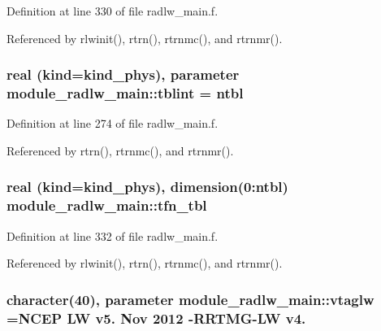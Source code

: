 Definition at line 330 of file radlw\+\_\+main.\+f.



Referenced by rlwinit(), rtrn(), rtrnmc(), and rtrnmr().

\subsubsection[{\texorpdfstring{tblint}{tblint}}]{\setlength{\rightskip}{0pt plus 5cm}real (kind=kind\+\_\+phys), parameter module\+\_\+radlw\+\_\+main\+::tblint = ntbl\hspace{0.3cm}{\ttfamily [private]}}\hypertarget{namespacemodule__radlw__main_af6b84954042db7b1e2a6abdb4d401ccf}{}\label{namespacemodule__radlw__main_af6b84954042db7b1e2a6abdb4d401ccf}


Definition at line 274 of file radlw\+\_\+main.\+f.



Referenced by rtrn(), rtrnmc(), and rtrnmr().

\subsubsection[{\texorpdfstring{tfn\+\_\+tbl}{tfn_tbl}}]{\setlength{\rightskip}{0pt plus 5cm}real (kind=kind\+\_\+phys), dimension(0\+:ntbl) module\+\_\+radlw\+\_\+main\+::tfn\+\_\+tbl\hspace{0.3cm}{\ttfamily [private]}}\hypertarget{namespacemodule__radlw__main_a71dcfb3c365280e100e180fd1ce939ad}{}\label{namespacemodule__radlw__main_a71dcfb3c365280e100e180fd1ce939ad}


Definition at line 332 of file radlw\+\_\+main.\+f.



Referenced by rlwinit(), rtrn(), rtrnmc(), and rtrnmr().

\subsubsection[{\texorpdfstring{vtaglw}{vtaglw}}]{\setlength{\rightskip}{0pt plus 5cm}character(40), parameter module\+\_\+radlw\+\_\+main\+::vtaglw =\textquotesingle{}N\+C\+EP LW v5. Nov 2012 -\/R\+R\+T\+MG-\/LW v4. \textquotesingle{}\hspace{0.3cm}{\ttfamily [private]}}\hypertarget{namespacemodule__radlw__main_a8d63a28d2550f8e193619e46a4c47d70}{}\label{namespacemodule__radlw__main_a8d63a28d2550f8e193619e46a4c47d70}


